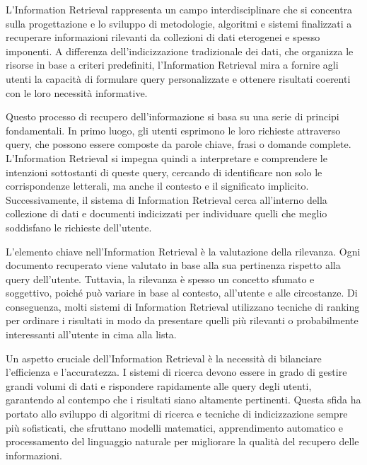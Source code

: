 L'Information Retrieval rappresenta un campo interdisciplinare che si concentra sulla progettazione e lo sviluppo di metodologie, algoritmi e sistemi finalizzati a recuperare informazioni rilevanti da collezioni di dati eterogenei e spesso imponenti. A differenza dell'indicizzazione tradizionale dei dati, che organizza le risorse in base a criteri predefiniti, l'Information Retrieval mira a fornire agli utenti la capacità di formulare query personalizzate e ottenere risultati coerenti con le loro necessità informative.

Questo processo di recupero dell'informazione si basa su una serie di principi fondamentali. In primo luogo, gli utenti esprimono le loro richieste attraverso query, che possono essere composte da parole chiave, frasi o domande complete. L'Information Retrieval si impegna quindi a interpretare e comprendere le intenzioni sottostanti di queste query, cercando di identificare non solo le corrispondenze letterali, ma anche il contesto e il significato implicito. Successivamente, il sistema di Information Retrieval cerca all'interno della collezione di dati e documenti indicizzati per individuare quelli che meglio soddisfano le richieste dell'utente.

L'elemento chiave nell'Information Retrieval è la valutazione della rilevanza. Ogni documento recuperato viene valutato in base alla sua pertinenza rispetto alla query dell'utente. Tuttavia, la rilevanza è spesso un concetto sfumato e soggettivo, poiché può variare in base al contesto, all'utente e alle circostanze. Di conseguenza, molti sistemi di Information Retrieval utilizzano tecniche di ranking per ordinare i risultati in modo da presentare quelli più rilevanti o probabilmente interessanti all'utente in cima alla lista.

Un aspetto cruciale dell'Information Retrieval è la necessità di bilanciare l'efficienza e l'accuratezza. I sistemi di ricerca devono essere in grado di gestire grandi volumi di dati e rispondere rapidamente alle query degli utenti, garantendo al contempo che i risultati siano altamente pertinenti. Questa sfida ha portato allo sviluppo di algoritmi di ricerca e tecniche di indicizzazione sempre più sofisticati, che sfruttano modelli matematici, apprendimento automatico e processamento del linguaggio naturale per migliorare la qualità del recupero delle informazioni.

